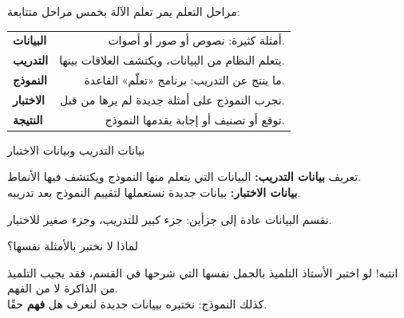 \documentclass[aspectratio=169, 11pt, xcolor={table}]{beamer}
\begin{document}
\begin{frame}{مراحل التعلم}
    يمر تعلم الآلة بخمس مراحل متتابعة:
    \begin{center}
    \end{center}
    \small
    \begin{tabularx}{\textwidth}{|>{\centering\arraybackslash}p{2.4cm}|R|}
        \hline
         &  \\ \hline
        \textbf{البيانات} & أمثلة كثيرة: نصوص أو صور أو أصوات. \\ \hline
        \textbf{التدريب}  & يتعلم النظام من البيانات، ويكتشف العلاقات بينها. \\ \hline
        \textbf{النموذج}  & ما ينتج عن التدريب: برنامج «تعلّم» القاعدة. \\ \hline
        \textbf{الاختبار} & نجرب النموذج على أمثلة جديدة لم يرها من قبل. \\ \hline
        \textbf{النتيجة}  & توقع أو تصنيف أو إجابة يقدمها النموذج. \\ \hline
    \end{tabularx}
\end{frame}

\begin{frame}{بيانات التدريب وبيانات الاختبار}
    \begin{tbox}{\faLightbulb\quad تعريف}
        \textbf{بيانات التدريب:} البيانات التي يتعلم منها النموذج ويكتشف فيها الأنماط.\\
        \textbf{بيانات الاختبار:} بيانات جديدة نستعملها لتقييم النموذج بعد تدريبه.
    \end{tbox}
    نقسم البيانات عادة إلى جزأين: جزء كبير للتدريب، وجزء صغير للاختبار.
    \begin{center}
    \end{center}
\end{frame}

\begin{frame}{لماذا لا نختبر بالأمثلة نفسها؟}
    \begin{obox}{\faExclamationTriangle\quad انتبه!}
        لو اختبر الأستاذ التلميذ بالجمل نفسها التي شرحها في القسم،
        فقد يجيب التلميذ من الذاكرة لا من الفهم.\\[3pt]
        كذلك النموذج: نختبره ببيانات جديدة لنعرف هل \textbf{فهم} حقًا.
    \end{obox}
\end{frame}
\end{document}

